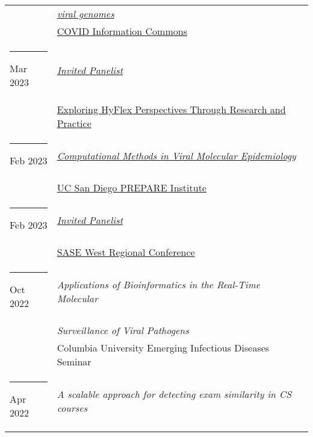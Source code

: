 \documentclass[margin,line]{res}
\begin{document}
\begin{resume}
\begin{longtable}{@{}p{0.7in}p{4in}}
\hspace*{-4mm} & \hspace{4mm} \href{https://doi.org/10.7916/kdj9-2t95}{\textit{viral genomes}}\\*
\hspace*{-4mm} & \hspace{4mm} \href{https://covidinfocommons.datascience.columbia.edu/}{COVID Information Commons}\\
\hspace*{-4mm} \rule{-1mm}{5mm} Mar 2023 & \href{https://teaching.ucr.edu/deck/2023/03/09/exploring-hyflex-perspectives-through-research-and-practice-panel-discussion}{\textit{Invited Panelist}}\\*
\hspace*{-4mm} & \hspace{4mm} \href{https://teaching.ucr.edu/deck/2023/03/09/exploring-hyflex-perspectives-through-research-and-practice-panel-discussion}{Exploring HyFlex Perspectives Through Research and Practice}\\
\hspace*{-4mm} \rule{-1mm}{5mm} Feb 2023 & \href{https://youtu.be/IkSkQPXsXds}{\textit{Computational Methods in Viral Molecular Epidemiology}}\\*
\hspace*{-4mm} & \hspace{4mm} \href{https://prepare.ucsd.edu/}{UC San Diego PREPARE Institute}\\
\hspace*{-4mm} \rule{-1mm}{5mm} Feb 2023 & \href{https://www.saseconnect.org/regional-conferences}{\textit{Invited Panelist}}\\*
\hspace*{-4mm} & \hspace{4mm} \href{https://www.saseconnect.org/regional-conferences}{SASE West Regional Conference}\\
\hspace*{-4mm} \rule{-1mm}{5mm} Oct 2022 & \textit{Applications of Bioinformatics in the Real-Time Molecular}\\*
\hspace*{-4mm} & \hspace{4mm} \textit{Surveillance of Viral Pathogens}\\*
\hspace*{-4mm} & \hspace{4mm} Columbia University Emerging Infectious Diseases Seminar\\
\hspace*{-4mm} \rule{-1mm}{5mm} Apr 2022 & \textit{A scalable approach for detecting exam similarity in CS courses}\\*

\end{longtable}
\end{resume}
\end{document}
